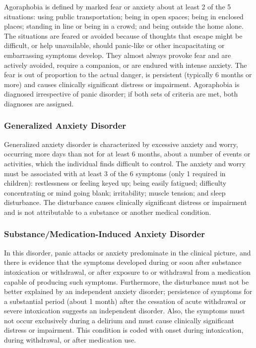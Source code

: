 Agoraphobia is defined by marked fear or anxiety about at least 2 of the
5 situations: using public transportation; being in open spaces; being in
enclosed places; standing in line or being in a crowd; and being outside the home
alone. The situations are feared or avoided because of thoughts that escape might
be difficult, or help unavailable, should panic-like or other incapacitating or
embarrassing symptoms develop. They almost always provoke fear and are actively
avoided, require a companion, or are endured with intense anxiety. The fear is out
of proportion to the actual danger, is persistent (typically 6 months or
more) and causes clinically significant distress or impairment. Agoraphobia is
diagnosed irrespective of panic disorder; if both sets of criteria are met, both
diagnoses are assigned.

\subsubsection{Generalized Anxiety Disorder}

Generalized anxiety disorder is characterized by excessive anxiety and worry,
occurring more days than not for at least 6 months, about a number of
events or activities, which the individual finds difficult to control. The
anxiety and worry must be associated with at least 3 of the 6 symptoms
(only 1 required in children): restlessness or feeling keyed up;
being easily fatigued; difficulty concentrating or mind going blank;
irritability; muscle tension; and sleep disturbance. The disturbance causes
clinically significant distress or impairment and is not attributable to a
substance or another medical condition.

\subsubsection{Substance/Medication-Induced Anxiety Disorder}

In this disorder, panic attacks or anxiety predominate in the clinical picture,
and there is evidence that the symptoms developed during or soon after substance
intoxication or withdrawal, or after exposure to or withdrawal from a medication
capable of producing such symptoms. Furthermore, the disturbance must not be better explained
by an independent anxiety disorder; persistence of symptoms for a substantial
period (about 1 month) after the cessation of acute withdrawal or severe
intoxication suggests an independent disorder. Also, the symptoms must not occur exclusively during a delirium and must cause clinically significant distress or
impairment. This condition is coded with onset during intoxication, during
withdrawal, or after medication use.

